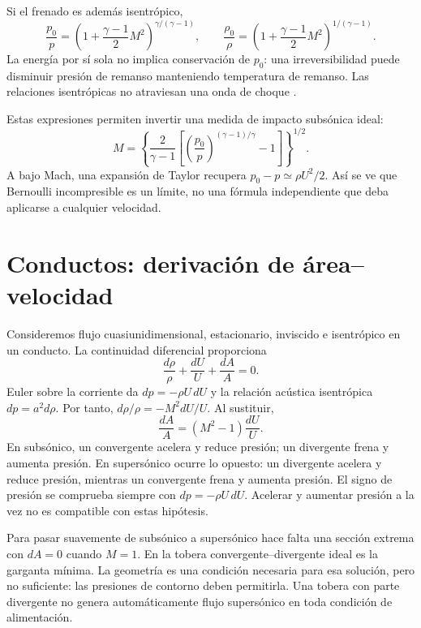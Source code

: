 Si el frenado es además isentrópico,
\begin{equation}\label{eq:08-p0}
 \frac{p_0}{p}=\left(1+\frac{\gamma-1}{2}M^2\right)^{\gamma/(\gamma-1)},\qquad
 \frac{\rho_0}{\rho}=\left(1+\frac{\gamma-1}{2}M^2\right)^{1/(\gamma-1)}.
\end{equation}
La energía por sí sola no implica conservación de $p_0$: una irreversibilidad puede disminuir presión de remanso manteniendo temperatura de remanso. Las relaciones isentrópicas no atraviesan una onda de choque \cite{NASA-BGA}.

Estas expresiones permiten invertir una medida de impacto subsónica ideal:
\begin{equation}
 M=\left\{\frac{2}{\gamma-1}\left[\left(\frac{p_0}{p}\right)^{(\gamma-1)/\gamma}-1\right]\right\}^{1/2}.
\end{equation}
A bajo Mach, una expansión de Taylor recupera $p_0-p\simeq\rho U^2/2$. Así se ve que Bernoulli incompresible es un límite, no una fórmula independiente que deba aplicarse a cualquier velocidad.

\section{Conductos: derivación de área--velocidad}
Consideremos flujo cuasiunidimensional, estacionario, inviscido e isentrópico en un conducto. La continuidad diferencial proporciona
\begin{equation}
 \frac{d\rho}{\rho}+\frac{dU}{U}+\frac{dA}{A}=0.
\end{equation}
Euler sobre la corriente da $dp=-\rho U\,dU$ y la relación acústica isentrópica $dp=a^2d\rho$. Por tanto, $d\rho/\rho=-M^2dU/U$. Al sustituir,
\begin{equation}\label{eq:08-area}
 \frac{dA}{A}=(M^2-1)\frac{dU}{U}.
\end{equation}
En subsónico, un convergente acelera y reduce presión; un divergente frena y aumenta presión. En supersónico ocurre lo opuesto: un divergente acelera y reduce presión, mientras un convergente frena y aumenta presión. El signo de presión se comprueba siempre con $dp=-\rho U\,dU$. Acelerar y aumentar presión a la vez no es compatible con estas hipótesis.

Para pasar suavemente de subsónico a supersónico hace falta una sección extrema con $dA=0$ cuando $M=1$. En la tobera convergente--divergente ideal es la garganta mínima. La geometría es una condición necesaria para esa solución, pero no suficiente: las presiones de contorno deben permitirla. Una tobera con parte divergente no genera automáticamente flujo supersónico en toda condición de alimentación.


